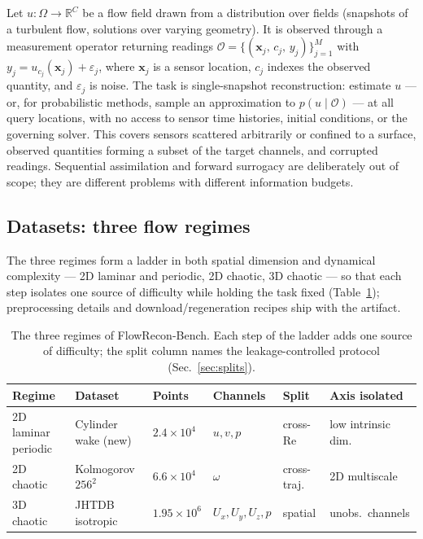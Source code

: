 \documentclass[aip,pof,reprint,amsmath,amssymb,superscriptaddress]{revtex4-1}
\newcommand{\benchname}{FlowRecon-Bench}
\begin{document}
Let $u:\Omega\to\mathbb{R}^{C}$ be a flow field drawn from a distribution over
fields (snapshots of a turbulent flow, solutions over varying geometry). It is
observed through a measurement operator returning readings
$\mathcal{O}=\{(\bm{x}_j,\,c_j,\,y_j)\}_{j=1}^{M}$ with
$y_j = u_{c_j}(\bm{x}_j)+\varepsilon_j$, where $\bm{x}_j$ is a sensor location,
$c_j$ indexes the observed quantity, and $\varepsilon_j$ is noise. The task is
single-snapshot reconstruction: estimate $u$ --- or, for probabilistic methods,
sample an approximation to $p(u\mid\mathcal{O})$ --- at all query locations,
with no access to sensor time histories, initial conditions, or the governing
solver. This covers sensors scattered arbitrarily or confined to a surface,
observed quantities forming a subset of the target channels, and corrupted
readings. Sequential assimilation and forward surrogacy are deliberately out of
scope; they are different problems with different information budgets.

\subsection{Datasets: three flow regimes}\label{sec:datasets}

The three regimes form a ladder in both spatial dimension and dynamical
complexity --- 2D laminar and periodic, 2D chaotic, 3D chaotic --- so that
each step isolates one source of difficulty while holding the task fixed
(Table~\ref{tab:regimes}); preprocessing details and download/regeneration
recipes ship with the artifact.

\begin{table}[tbp]
\caption{\label{tab:regimes}The three regimes of \benchname{}. Each step of
the ladder adds one source of difficulty; the split column names the
leakage-controlled protocol (Sec.~\ref{sec:splits}).}
\footnotesize
\begin{ruledtabular}
\begin{tabular}{llllll}
Regime & Dataset & Points & Channels & Split & Axis isolated \\
\hline
2D laminar periodic & Cylinder wake (new) & $2.4{\times}10^{4}$ & $u,v,p$ & cross-Re & low intrinsic dim. \\
2D chaotic & Kolmogorov $256^2$\cite{shu2023physics} & $6.6{\times}10^{4}$ & $\omega$ & cross-traj. & 2D multiscale \\
3D chaotic & JHTDB isotropic\cite{li2008public} & $1.95{\times}10^{6}$ & $U_x,U_y,U_z,p$ & spatial & unobs.\ channels \\
\end{tabular}
\end{ruledtabular}
\end{table}
\end{document}
